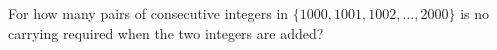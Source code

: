 For how many pairs of consecutive integers in $\{1000,1001,1002,\ldots,2000\}$ is no carrying required when the two integers are added?